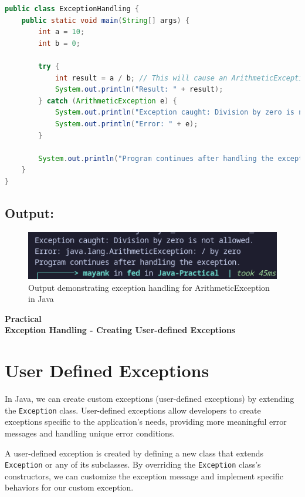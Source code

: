 \documentclass[a4paper,12pt]{article}
\newcounter{practicalno} %
\newcommand{\practicaltitle}[1]{
    \stepcounter{practicalno} %
    \newpage
    \begin{center}
        \vspace{1cm}
        \Large\textbf{Practical \thepracticalno} \\
        \vspace{0.5cm}
        \Large\textbf{#1} %
        \normalsize\vspace{1cm}
    \end{center}
}
\begin{document}
\begin{lstlisting}[language=Java]
public class ExceptionHandling {
    public static void main(String[] args) {
        int a = 10;
        int b = 0;

        try {
            int result = a / b; // This will cause an ArithmeticException
            System.out.println("Result: " + result);
        } catch (ArithmeticException e) {
            System.out.println("Exception caught: Division by zero is not allowed.");
            System.out.println("Error: " + e);
        }

        System.out.println("Program continues after handling the exception.");
    }
}
\end{lstlisting}

\subsection{Output:}
\begin{figure}[H]
    \centering
    \includegraphics[width=0.8\linewidth]{images/30.png}
    \caption{Output demonstrating exception handling for ArithmeticException in Java}
\end{figure}

\setcounter{section}{0}
\practicaltitle{Exception Handling - Creating User-defined Exceptions}

\section{User Defined Exceptions}
In Java, we can create custom exceptions (user-defined exceptions) by extending the \texttt{Exception} class. User-defined exceptions allow developers to create exceptions specific to the application's needs, providing more meaningful error messages and handling unique error conditions.

A user-defined exception is created by defining a new class that extends \texttt{Exception} or any of its subclasses. By overriding the \texttt{Exception} class’s constructors, we can customize the exception message and implement specific behaviors for our custom exception.
\end{document}
